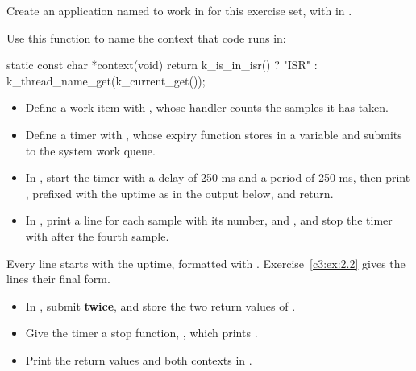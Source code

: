 \label{c3:set:2}
Create an application named  to work in for this exercise set, with
 in .

Use this function to name the context that code runs in:

\begin{ccode}
static const char *context(void)
{
	return k_is_in_isr() ? "ISR" : k_thread_name_get(k_current_get());
}
\end{ccode}

\label{c3:ex:2.1}

\begin{itemize}
  \item Define a work item  with , whose handler
     counts the samples it has taken.
  \item Define a timer  with , whose expiry function
     stores  in a variable  and submits
     to the system work queue.
  \item In , start the timer with a delay of 250 ms and a period of 250 ms, then print
    , prefixed with the uptime as in the output below, and return.
  \item In , print a line for each sample with its number,  and
    , and stop the timer with  after the fourth sample.
\end{itemize}

Every line starts with the uptime, formatted with . Exercise~\ref{c3:ex:2.2}
gives the lines their final form.

\label{c3:ex:2.2}

\begin{itemize}
  \item In , submit  \textbf{twice}, and store the two return values
    of .
  \item Give the timer a stop function, , which prints .
  \item Print the return values and both contexts in .
\end{itemize}

